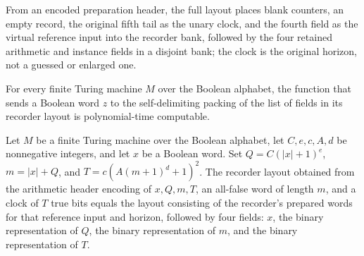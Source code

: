 \begin{definition}
\label{Complexity.clHeaderLayout}
\leanok
{}
From an encoded preparation header, the full layout places blank counters, an empty record, the original fifth tail as the unary clock, and the fourth field as the virtual reference input into the recorder bank, followed by the four retained arithmetic and instance fields in a disjoint bank; the clock is the original horizon, not a guessed or enlarged one.
\end{definition}

\begin{lemma}
\label{Complexity.clHeaderLayout_native}
\leanok
{}
For every finite Turing machine $M$ over the Boolean alphabet, the function that sends a
Boolean word $z$ to the self-delimiting packing of the list of fields in its recorder
layout is polynomial-time computable.
\end{lemma}

\begin{lemma}
\label{Complexity.clHeaderLayout_exact}
\leanok
{}
Let $M$ be a finite Turing machine over the Boolean alphabet, let $C,e,c,A,d$ be
nonnegative integers, and let $x$ be a Boolean word. Set $Q=C(|x|+1)^e$, $m=|x|+Q$, and
$T=c(A(m+1)^d+1)^2$. The recorder layout obtained from the arithmetic header encoding of
$x,Q,m,T$, an all-false word of length $m$, and a clock of $T$ true bits equals the
layout consisting of the recorder’s prepared words for that reference input and horizon,
followed by four fields: $x$, the binary representation of $Q$, the binary
representation of $m$, and the binary representation of $T$.
\end{lemma}

